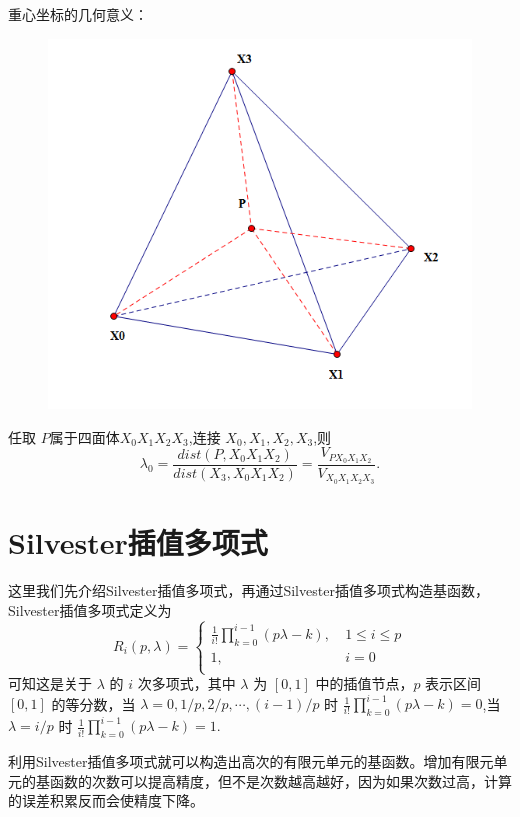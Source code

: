 \documentclass[12pt,a4paper]{article}
\begin{document}
重心坐标的几何意义：
\begin{figure}[H]
\centering
\includegraphics[scale=0.7]{./figures/8.png}
\caption{}
\end{figure}

任取 $P$属于四面体$X_0 X_1 X_2 X_3$,连接 $X_0 ,X_1 ,X_2 ,X_3$,则
$$
\lambda _0=\frac {dist(P,X_0 X_1 X_2)}{dist(X_3,X_0 X_1 X_2)}=\frac{V_{P X_0 X_1 X_2}}{V_{X_0 X_1 X_2 X_3}}.
$$

\section{Silvester插值多项式}
这里我们先介绍Silvester插值多项式，再通过Silvester插值多项式构造基函数，Silvester插值多项式定义为
$$
R_i (p,\lambda)=\begin{cases}
\frac{1}{i!}\prod_{k=0}^{i-1} (p\lambda-k),~& 1\leqslant i\leqslant p\\
1,& i=0\\
\end{cases}
$$
可知这是关于 $\lambda$ 的 $i$ 次多项式，其中 $\lambda$ 为 $[0,1]$ 中的插值节点，$p$ 表示区间 $[0,1]$ 的等分数，当 $\lambda=0,1/p,2/p,\cdots ,(i-1)/p$ 时 $\frac{1}{i!}\prod_{k=0}^{i-1} (p\lambda-k) =0$,当 $\lambda=i/p$ 时 $\frac{1}{i!}\prod_{k=0}^{i-1} (p\lambda-k) =1.$

利用Silvester插值多项式就可以构造出高次的有限元单元的基函数。增加有限元单元的基函数的次数可以提高精度，但不是次数越高越好，因为如果次数过高，计算的误差积累反而会使精度下降。
\end{document}
